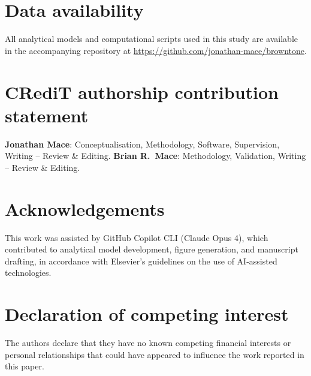 \documentclass[review]{elsarticle}
\begin{document}









\section*{Data availability}
All analytical models and computational scripts used in this study are
available in the accompanying repository at
\url{https://github.com/jonathan-mace/browntone}.

\section*{CRediT authorship contribution statement}
\textbf{Jonathan Mace}: Conceptualisation, Methodology, Software, Supervision,
Writing -- Review \& Editing.
\textbf{Brian R.\ Mace}: Methodology, Validation, Writing -- Review \& Editing.

\section*{Acknowledgements}
This work was assisted by GitHub Copilot CLI (Claude Opus 4), which
contributed to analytical model development, figure generation, and manuscript
drafting, in accordance with Elsevier's guidelines on the use of AI-assisted
technologies.

\section*{Declaration of competing interest}
The authors declare that they have no known competing financial interests
or personal relationships that could have appeared to influence the work
reported in this paper.
\end{document}
